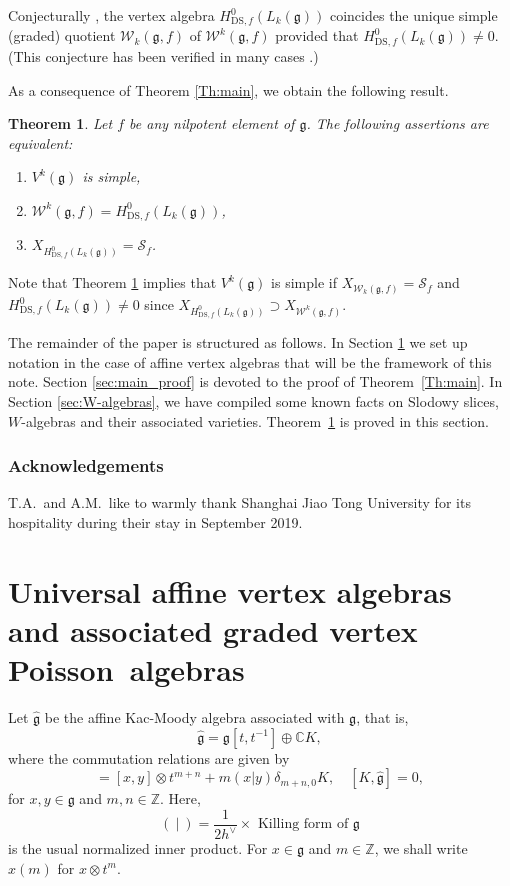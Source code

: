 \documentclass[JEP,XML,SOM,Unicode]{cedram}
\let\oldvee\vee
\renewcommand{\vee}{{\scriptscriptstyle\oldvee}}
\newcommand{\DS}{\mathrm{DS}}
\newcommand\C{{\mathbb C}}
\newcommand\Z{{\mathbb Z}}
\newcommand \g{\mathfrak g}
\newcommand \frg{\widehat{\mathfrak{g}}}
\newcommand \W{\mathscr{W}}
\newtheorem{theorem}{Theorem}[section]
\theoremstyle{definition}
\begin{document}
Conjecturally \cite{KacRoaWak03,KacWak08},
the vertex algebra
$H^{0}_{\DS,f}(L_k(\g))$ coincides
the unique simple (graded) quotient $\W_k(\g,f)$
of $\W^k(\g,f)$
provided that
\hbox{$H^{0}_{\DS,f}(L_k(\g))\ne 0$.}
(This conjecture has been verified in many cases \cite{Ara05,Ara07,Ara08-a,AEkeren19}.)

As a consequence of Theorem \ref{Th:main}, we obtain the following
result.

\begin{theorem}\label{Th:main2}
Let $f$ be any nilpotent element of $\g$.
The following assertions are equivalent:
\begin{enumerate}
\item\label{Th:main21} $V^k(\g)$ is simple,
\item\label{Th:main22} $\W^k(\g,f)=H^{0}_{\DS,f}(L_k(\g))$,
\item\label{Th:main23} $X_{H^{0}_{\DS,f}(L_k(\g))} = \mathscr{S}_f$.
\end{enumerate}
\end{theorem}

Note that Theorem \ref{Th:main2} implies that
$V^k(\g)$ is simple
if
$X_{\W_k(\g,f)}=\mathscr{S}_f$
and $H^{0}_{\DS,f}(L_k(\g))\ne 0$
since
$ X_{H_{\DS,f}^0(L_k(\g))}\supset X_{\W^k(\g,f)}$.

The remainder of the paper is structured as follows.
In Section \ref{sec:affine_vertex_algebras} we set up notation
in the case of affine vertex algebras that will be the framework of this note.
Section \ref{sec:main_proof} is devoted to the proof of Theorem~\ref{Th:main}.
In Section \ref{sec:W-algebras}, we have compiled some known facts
on Slodowy slices, $W$-algebras and their associated varieties.
Theorem~\ref{Th:main2} is proved in this section.

\subsubsection*{Acknowledgements}
T.A.~and A.M.~like to warmly thank Shanghai Jiao Tong University
for its hospitality during their stay in September 2019.

\section{Universal affine vertex algebras and associated
graded vertex \texorpdfstring{Poisson~algebras}{Poisson algebras}}
\label{sec:affine_vertex_algebras}
Let
$\frg$ be the affine Kac-Moody algebra associated with $\g$, that is,
\begin{equation*}
\frg =\g [t,t^{-1}]\oplus \C K,
\end{equation*}
where the commutation relations are given by
\begin{equation*}
[x\otimes t^m,y\otimes t^n]=[x,y]\otimes t^{m+n}+m(x|y)\delta_{m+n,0}K,\quad
[K,\frg]=0,
\end{equation*}
for $x,y\in \g$ and $m,n\in \Z$.
Here,
\[
(~|~)=\displaystyle{\frac{1}{2h^\vee}\times} \text{ Killing form of }\g
\]
is the usual normalized inner product.
For $x \in \g$ and $m \in \Z$, we shall write $x(m)$ for $x
\otimes t^m$.
\end{document}
